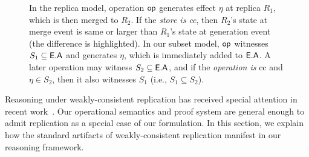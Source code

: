 \begin{figure}
{}
\hspace*{0.1in}
 \caption{\small In the replica model, operation $\textsf{op}$ generates effect
$\eta$ at replica $R_1$, which is then merged to $R_2$. If the
\emph{store is {\sc cc}}, then $R_2$'s state at merge event is same or
larger than $R_1$'s state at generation event (the difference is
highlighted). In our subset model, $\textsf{op}$ witnesses $S_1 \subseteq
\textsf{E}.\textsf{A}$ and generates $\eta$, which is immediately added to $\textsf{E}.\textsf{A}$. A
later operation may witness $S_2 \subseteq \textsf{E}.\textsf{A}$, and if the
\emph{operation is} {\sc cc} and $\eta \in S_2$, then it also
witnesses $S_1$ (i.e., $S_1 \subseteq S_2$). } 
\label{fig:ec-theirs-vs-ours}
\end{figure}

Reasoning under weakly-consistent replication has received special
attention in recent work~\cite{gotsmanpopl16}. Our operational
semantics and proof system are general enough to admit replication as
a special case of our formulation. In this section, we explain how the
standard artifacts of weakly-consistent replication manifest in our
reasoning framework.

